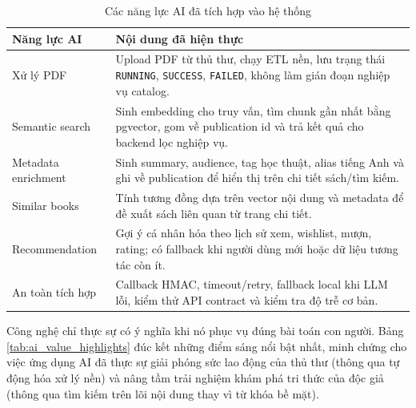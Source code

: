 \begin{table}[H]
\centering
\small
\begin{tabularx}{\textwidth}{|p{3.5cm}|X|}
\hline
\textbf{Năng lực AI} & \textbf{Nội dung đã hiện thực} \\
\hline
Xử lý PDF &
Upload PDF từ thủ thư, chạy ETL nền, lưu trạng thái \texttt{RUNNING},
\texttt{SUCCESS}, \texttt{FAILED}, không làm gián đoạn nghiệp vụ catalog. \\
\hline
Semantic search &
Sinh embedding cho truy vấn, tìm chunk gần nhất bằng pgvector, gom về
publication id và trả kết quả cho backend lọc nghiệp vụ. \\
\hline
Metadata enrichment &
Sinh summary, audience, tag học thuật, alias tiếng Anh và ghi về publication để
hiển thị trên chi tiết sách/tìm kiếm. \\
\hline
Similar books &
Tính tương đồng dựa trên vector nội dung và metadata để đề xuất sách liên quan
từ trang chi tiết. \\
\hline
Recommendation &
Gợi ý cá nhân hóa theo lịch sử xem, wishlist, mượn, rating; có fallback khi
người dùng mới hoặc dữ liệu tương tác còn ít. \\
\hline
An toàn tích hợp &
Callback HMAC, timeout/retry, fallback local khi LLM lỗi, kiểm thử API contract
và kiểm tra độ trễ cơ bản. \\
\hline
\end{tabularx}
\caption{Các năng lực AI đã tích hợp vào hệ thống}
\label{tab:ai_capability_summary}
\end{table}

Công nghệ chỉ thực sự có ý nghĩa khi nó phục vụ đúng bài toán con người. Bảng \ref{tab:ai_value_highlights} đúc kết những điểm sáng nổi bật nhất, minh chứng cho việc ứng dụng AI đã thực sự giải phóng sức lao động của thủ thư (thông qua tự động hóa xử lý nền) và nâng tầm trải nghiệm khám phá tri thức của độc giả (thông qua tìm kiếm trên lõi nội dung thay vì từ khóa bề mặt).

